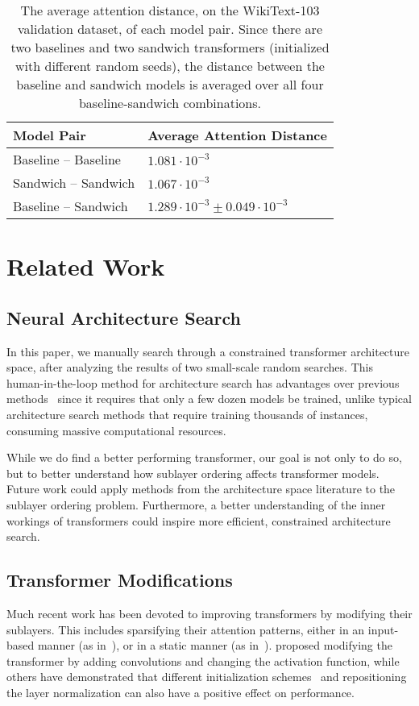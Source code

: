 \documentclass[11pt,a4paper]{article}
\begin{document}
\begin{table}[t]
\centering
\small
\begin{tabular}{@{}ll@{}}
\toprule
\textbf{Model Pair} & \textbf{Average Attention Distance} \\
\midrule
Baseline -- Baseline & $1.081 \cdot 10^{-3}$ \\
Sandwich  -- Sandwich & $1.067\cdot 10^{-3}$ \\
Baseline -- Sandwich & $1.289 \cdot 10^{-3} \pm 0.049 \cdot  10^{-3}$\\
\bottomrule
\end{tabular}
\caption{The average attention distance, on the WikiText-103 validation dataset, of each model pair. Since there are two baselines and two sandwich transformers (initialized with different random seeds), the distance between the baseline and sandwich models is averaged over all four baseline-sandwich combinations. }
\label{tab.analysis}
\end{table} \section{Related Work}

\subsection{Neural Architecture Search}
In this paper, we manually search through a constrained transformer architecture space, after analyzing the results of two small-scale random searches. This human-in-the-loop method for architecture search has advantages over previous methods~\cite{jozefowicz2015empirical,zoph2016neural,efficientnet} since it requires that only a few dozen models be trained, unlike typical architecture search methods that require training thousands of instances, consuming massive computational resources.

While we do find a better performing transformer, our goal is not only to do so, but to better understand how sublayer ordering affects transformer models. Future work could apply methods from the architecture space literature to the sublayer ordering problem. Furthermore, a better understanding of the inner workings of transformers could inspire more efficient, constrained architecture search.

\subsection{Transformer Modifications}
Much recent work has been devoted to improving transformers by modifying their sublayers. This includes sparsifying their attention patterns, either in an input-based manner (as in~\citealp{correia2019adaptively}), or in a static manner (as in~\citealp{startransformer}). \citet{evolvedtransformer} proposed modifying the transformer by adding convolutions and changing the activation function, while others have demonstrated that different initialization schemes~\cite{zhang2019improving} and repositioning the layer normalization \cite{nguyen2019transformers} can also have a positive effect on performance. 
\end{document}
